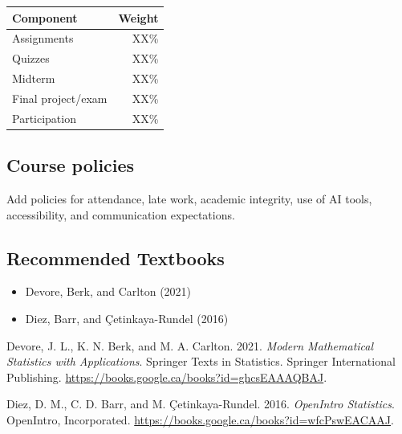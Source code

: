 \documentclass[
  letterpaper,
  DIV=11,
  numbers=noendperiod]{scrartcl}
\newlength{\cslhangindent}
\newenvironment{CSLReferences}[2] %
 {\begin{list}{}{%
  \setlength{\itemindent}{0pt}
  \setlength{\leftmargin}{0pt}
  \setlength{\parsep}{0pt}
  \ifodd #1
   \setlength{\leftmargin}{\cslhangindent}
   \setlength{\itemindent}{-1\cslhangindent}
  \fi
  \setlength{\itemsep}{#2\baselineskip}}}
 {\end{list}}
\providecommand{\tightlist}{%
  \setlength{\itemsep}{0pt}\setlength{\parskip}{0pt}}
\begin{document}
\begin{longtable}[]{@{}lr@{}}
\toprule\noalign{}
Component & Weight \\
\midrule\noalign{}
\endhead
\bottomrule\noalign{}
\endlastfoot
Assignments & XX\% \\
Quizzes & XX\% \\
Midterm & XX\% \\
Final project/exam & XX\% \\
Participation & XX\% \\
\end{longtable}

\subsection{Course policies}\label{course-policies}

Add policies for attendance, late work, academic integrity, use of AI
tools, accessibility, and communication expectations.

\subsection{Recommended Textbooks}\label{recommended-textbooks}

\begin{itemize}
\tightlist
\item
  Devore, Berk, and Carlton (2021)
\item
  Diez, Barr, and Çetinkaya-Rundel (2016)
\end{itemize}

\label{refs}
\begin{CSLReferences}{1}{0}
Devore, J. L., K. N. Berk, and M. A. Carlton. 2021. \emph{Modern
Mathematical Statistics with Applications}. Springer Texts in
Statistics. Springer International Publishing.
\url{https://books.google.ca/books?id=ghcsEAAAQBAJ}.

Diez, D. M., C. D. Barr, and M. Çetinkaya-Rundel. 2016. \emph{OpenIntro
Statistics}. OpenIntro, Incorporated.
\url{https://books.google.ca/books?id=wfcPswEACAAJ}.

\end{CSLReferences}
\end{document}
